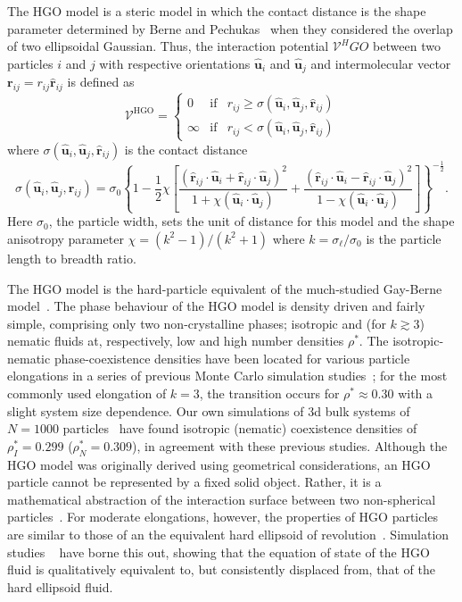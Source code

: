 \documentclass[aps,10pt,twocolumn]{revtex4}
\newcommand{\mrm}[1]{\mathrm{#1}}
\newcommand{\vect}[1]{ \mathbf{#1} }
\newcommand{\vecth}[1]{ \mathbf{\hat{#1} } }
\newcommand{\lp}{\left(}
\newcommand{\rp}{\right)}
\newcommand{\so}{\sigma_0}
\newcommand{\sel}{\sigma_\ell}
\newcommand{\rij}{\vecth{r}_{ij}}
\newcommand{\ui}{\vecth{u}_i}
\newcommand{\uj}{\vecth{u}_j}
\newcommand{\sijr}{\sigma(\ui,\uj,\rij)}
\newcommand{\dotProd}[2]{ #1 \cdot #2 }
\begin{document}
The HGO model is a steric model in which the contact distance is the shape parameter determined
by Berne and Pechukas~\cite{BernePechukas72} when they considered the overlap of two ellipsoidal
Gaussian.  Thus, the  interaction potential $\mathcal{V}^HGO$ between
two particles $i$ and $j$ with respective orientations $\ui$  and $\uj$ and intermolecular vector $\vect{r}_{ij} =
r_{ij}\rij$ is defined as
\begin{equation}
    \mathcal{V}^\mrm{HGO} = \left\{  %
    \begin{array}{ccc}
    0   &\mrm{if}   &r_{ij} \geq \sijr  \\
    \infty  &\mrm{if}   &r_{ij} < \sijr
    \end{array}
    \right.
\end{equation}
where $\sijr$ is the contact distance
\begin{equation}
    \sijr = \so\left\{
    1 - \frac{1}{2}\chi\left[
    \frac{ \lp\dotProd{\rij}{\ui} + \dotProd{\rij}{\uj}\rp^2 }{1 + \chi(\dotProd{\ui}{\uj})}
      + \frac{ \lp\dotProd{\rij}{\ui} - \dotProd{\rij}{\uj}\rp^2 }{1 - \chi(\dotProd{\ui}{\uj})}
    \right] \right\}^{-\frac{1}{2}}.
\end{equation}
Here $\so$, the particle width, sets the unit of distance for this model and the shape anisotropy parameter $\chi
= (k^2-1)/(k^2+1)$ where $k= \sel/\so$ is the particle length to breadth ratio.

The HGO model is the hard-particle equivalent of the much-studied Gay-Berne model~\cite{GayBerne81}.  The phase
behaviour of the HGO model is density driven and fairly simple, comprising only two non-crystalline phases;
isotropic and (for $k\gtrsim 3$) nematic fluids at, respectively, low and high number densities $\rho^{*}$. The
isotropic-nematic phase-coexistence densities have been located for various particle elongations in a series of
previous Monte Carlo simulation studies~\cite{PadillaVelasco97,DeMiguelDelRio01,DeMiguelDelRio03}; for the most
commonly used elongation of $k=3$, the transition occurs for $\rho^{*}\approx 0.30$ with a slight system size
dependence. Our own simulations of 3d bulk systems of $N=1000$ particles~\cite{fbThesis,TeixeiraBarmes03} have
found isotropic (nematic) coexistence densities of $\rho^{*}_I=0.299$ ($\rho^{*}_N=0.309$), in agreement with
these previous studies. Although the HGO model was originally derived using geometrical considerations, an HGO
particle cannot be represented by a fixed solid object. Rather, it is a mathematical abstraction of
the interaction surface between two non-spherical particles~\cite{Rigby89}. For moderate
elongations, however, the properties of
HGO particles are similar to those of an the equivalent hard ellipsoid of revolution~\cite{Rigby89}. Simulation
studies ~\cite{DeMiguelDelRio03} have borne this out, showing that the equation of state of the HGO fluid is
qualitatively equivalent to, but consistently displaced from, that of the hard ellipsoid fluid.
\end{document}
